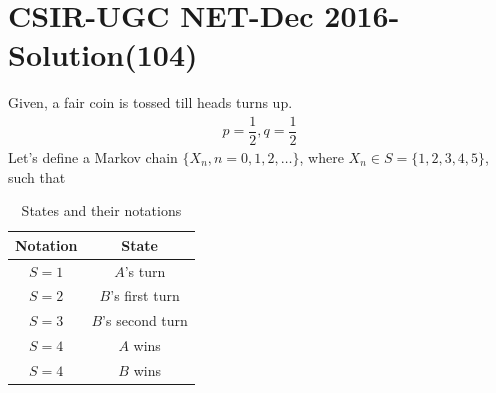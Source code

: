 \documentclass[journal,12pt,twocolumn]{IEEEtran}
\begin{document}
\section*{CSIR-UGC NET-Dec 2016-Solution(104)}
Given, a fair coin is tossed till heads turns up.
\begin{align}
\tag{104.1}
\label{eq:0}
    p=\dfrac{1}{2},q=\dfrac{1}{2}
\end{align}
Let's define a Markov chain $\{X_{n},n=0,1,2,\dots\}$, where $X_{n}\in S=\{1,2,3,4,5\}$, such that
\begin{table}[h!]
\centering
\caption{States and their notations}
\label{table:2}
\begin{tabular}{|c|c|}
    \hline
    Notation & State \\
    \hline
    $S=1$ & $A$'s turn\\[1ex]
    \hline
    $S=2$ & $B$'s first turn\\[1ex]
    \hline
    $S=3$ & $B$'s second turn\\[1ex]
    \hline
    $S=4$ & $A$ wins\\[1ex]
    \hline
    $S=4$ & $B$ wins\\[1ex]
    \hline
\end{tabular}
\end{table}
\end{document}
